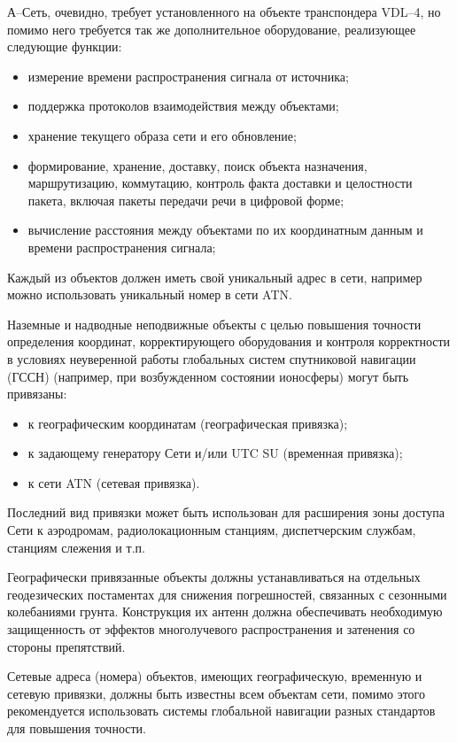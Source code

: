 \documentclass[a4paper,12pt]{report} %
\begin{document}
А--Сеть, очевидно, требует установленного на объекте транспондера VDL--4, но
помимо него требуется так же дополнительное оборудование, реализующее следующие
функции:
\begin{itemize}
\item измерение времени распространения сигнала от источника;
\item поддержка протоколов взаимодействия между объектами;
\item хранение текущего образа сети и его обновление;
\item формирование, хранение, доставку, поиск объекта назначения, маршрутизацию,
  коммутацию, контроль факта доставки и целостности пакета, включая пакеты
  передачи речи в цифровой форме;
\item вычисление расстояния между объектами по их координатным данным и времени
  распространения сигнала;
\end{itemize}

Каждый из объектов должен иметь свой уникальный адрес в сети, например можно
использовать уникальный номер в сети ATN.

Наземные и надводные неподвижные объекты с целью повышения точности определения
координат, корректирующего оборудования и контроля корректности в условиях
неуверенной работы глобальных систем спутниковой навигации (ГССН) (например, при
возбужденном состоянии ионосферы) могут быть привязаны:
\begin{itemize}
\item к географическим координатам (географическая привязка);
\item к задающему генератору Сети и/или UTC SU (временная привязка);
\item к сети ATN (сетевая привязка).
\end{itemize}
Последний вид привязки может быть использован для расширения зоны доступа
Сети к аэродромам, радиолокационным станциям, диспетчерским службам, станциям
слежения и т.п.

Географически привязанные объекты должны устанавливаться на отдельных
геодезических постаментах для снижения погрешностей, связанных с сезонными
колебаниями грунта. Конструкция их антенн должна обеспечивать необходимую
защищенность от эффектов многолучевого распространения и затенения со стороны
препятствий.

Сетевые адреса (номера) объектов, имеющих географическую, временную и сетевую
привязки, должны быть известны всем объектам сети, помимо этого рекомендуется
использовать системы глобальной навигации разных стандартов для повышения
точности.
\end{document}
